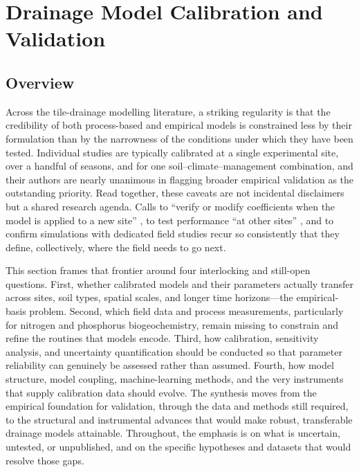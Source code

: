 \documentclass[11pt]{article}
\begin{document}
\section*{Drainage Model Calibration and Validation}

\subsection{Overview}

Across the tile-drainage modelling literature, a striking regularity is that the credibility of both process-based and empirical models is constrained less by their formulation than by the narrowness of the conditions under which they have been tested. Individual studies are typically calibrated at a single experimental site, over a handful of seasons, and for one soil--climate--management combination, and their authors are nearly unanimous in flagging broader empirical validation as the outstanding priority. Read together, these caveats are not incidental disclaimers but a shared research agenda. Calls to ``verify or modify coefficients when the model is applied to a new site'' \parencite{Li2006}, to test performance ``at other sites'' \parencite{Qi2015}, and to confirm simulations with dedicated field studies \parencite{Shipitalo2016,Yousfi2014} recur so consistently that they define, collectively, where the field needs to go next.

This section frames that frontier around four interlocking and still-open questions. First, whether calibrated models and their parameters actually transfer across sites, soil types, spatial scales, and longer time horizons---the empirical-basis problem. Second, which field data and process measurements, particularly for nitrogen and phosphorus biogeochemistry, remain missing to constrain and refine the routines that models encode. Third, how calibration, sensitivity analysis, and uncertainty quantification should be conducted so that parameter reliability can genuinely be assessed rather than assumed. Fourth, how model structure, model coupling, machine-learning methods, and the very instruments that supply calibration data should evolve. The synthesis moves from the empirical foundation for validation, through the data and methods still required, to the structural and instrumental advances that would make robust, transferable drainage models attainable. Throughout, the emphasis is on what is uncertain, untested, or unpublished, and on the specific hypotheses and datasets that would resolve those gaps.
\end{document}
